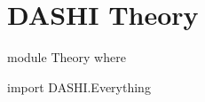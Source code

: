 \documentclass{article}
\begin{document}
\section*{DASHI Theory}

\begin{code}
module Theory where

import DASHI.Everything
\end{code}
\end{document}
